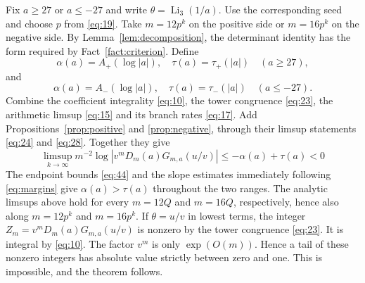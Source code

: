 Fix $a\ge27$ or $a\le-27$ and write $\theta=\operatorname{Li}_3(1/a)$. Use
the corresponding seed and choose $p$ from \eqref{eq:19}. Take $m=12p^k$
on the positive side or $m=16p^k$ on the negative side. By
Lemma~\ref{lem:decomposition}, the determinant identity has the
form required by Fact~\ref{fact:criterion}. Define
\[
 \alpha(a)=A_+(\log|a|),\quad \tau(a)=\tau_+(|a|)\quad(a\ge27),
\]
and
\[
 \alpha(a)=A_-(\log|a|),\quad \tau(a)=\tau_-(|a|)\quad(a\le-27).
\]
Combine the coefficient integrality \eqref{eq:10}, the tower congruence
\eqref{eq:23}, the arithmetic limsup \eqref{eq:15} and its branch rates
\eqref{eq:17}. Add Propositions~\ref{prop:positive} and
\ref{prop:negative}, through their limsup statements \eqref{eq:24} and
\eqref{eq:28}. Together they give
\[
 \limsup_{k\to\infty}m^{-2}\log
 \left|v^mD_m(a)G_{m,a}(u/v)\right|
 \le -\alpha(a)+\tau(a)<0
\]
The endpoint bounds \eqref{eq:44} and the slope estimates immediately
following \eqref{eq:margins} give $\alpha(a)>\tau(a)$ throughout the two
ranges. The analytic limsups above hold for every $m=12Q$ and $m=16Q$,
respectively, hence also along $m=12p^k$ and $m=16p^k$. If
$\theta=u/v$ in lowest terms, the integer
$Z_m=v^mD_m(a)G_{m,a}(u/v)$ is nonzero by the tower congruence
\eqref{eq:23}. It is integral by \eqref{eq:10}. The factor $v^m$ is
only $\exp(O(m))$. Hence a tail of these nonzero integers has absolute
value strictly between zero and one. This is impossible, and the theorem
follows.


